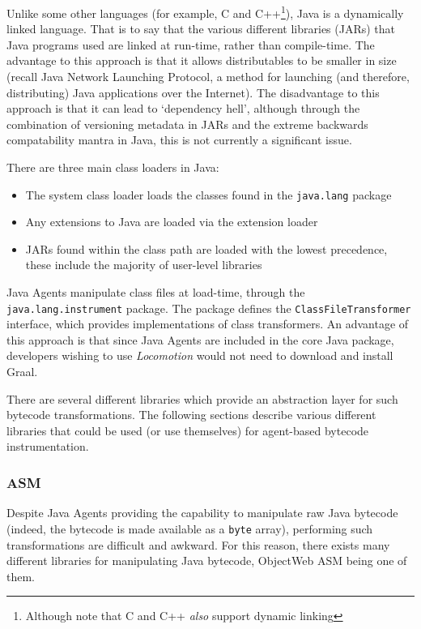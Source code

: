 	Unlike some other languages (for example, C and C++\footnote{Although note that C and C++ \emph{also} support dynamic linking}), Java is a dynamically linked language. That is to say that the various different libraries (JARs) that Java programs used are linked at run-time, rather than compile-time. The advantage to this approach is that it allows distributables to be smaller in size (recall Java Network Launching Protocol, a method for launching (and therefore, distributing) Java applications over the Internet). The disadvantage to this approach is that it can lead to `dependency hell', although through the combination of versioning metadata in JARs and the extreme backwards compatability mantra in Java, this is not currently a significant issue.
		
		There are three main class loaders in Java:
		
		\begin{itemize}
			\item The system class loader loads the classes found in the \texttt{java.lang} package
			\item Any extensions to Java are loaded via the extension loader
			\item JARs found within the class path are loaded with the lowest precedence, these include the majority of user-level libraries
		\end{itemize}
		
		Java Agents manipulate class files at load-time, through the \texttt{java.lang.instrument} package. The package defines the \texttt{ClassFileTransformer} interface, which provides implementations of class transformers. An advantage of this approach is that since Java Agents are included in the core Java package, developers wishing to use \textit{Locomotion} would not need to download and install Graal.
		
		There are several different libraries which provide an abstraction layer for such bytecode transformations. The following sections describe various different libraries that could be used (or use themselves) for agent-based bytecode instrumentation.

		\subsubsection{ASM} \label{sec:instrumentation/bytecode-instr/asm}
		Despite Java Agents providing the capability to manipulate raw Java bytecode (indeed, the bytecode is made available as a \texttt{byte} array), performing such transformations are difficult and awkward. For this reason, there exists many different libraries for manipulating Java bytecode, ObjectWeb ASM being one of them.
		
